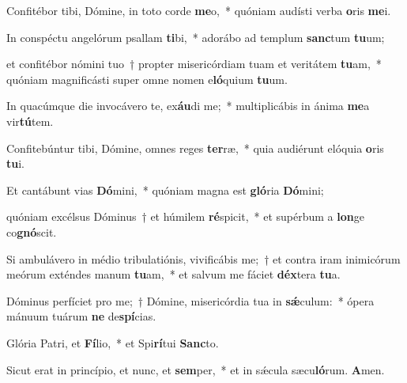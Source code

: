\item Confitébor tibi, Dómine, in toto corde \textbf{me}o,~* quóniam audísti verba \textbf{o}ris \textbf{me}i.

\item In conspéctu angelórum psallam \textbf{ti}bi,~* adorábo ad templum \textbf{sanc}tum \textbf{tu}um;

\item et confitébor nómini tuo~† propter misericórdiam tuam et veritátem \textbf{tu}am,~* quóniam magnificásti super omne nomen e\textbf{ló}quium \textbf{tu}um.

\item In quacúmque die invocávero te, ex\textbf{áu}di me;~* multiplicábis in ánima \textbf{me}a vir\textbf{tú}tem.

\item Confitebúntur tibi, Dómine, omnes reges \textbf{ter}ræ,~* quia audiérunt elóquia \textbf{o}ris \textbf{tu}i.

\item Et cantábunt vias \textbf{Dó}mini,~* quóniam magna est \textbf{gló}ria \textbf{Dó}mini;

\item quóniam excélsus Dóminus~† et húmilem \textbf{ré}spicit,~* et supérbum a \textbf{lon}ge co\textbf{gnó}scit.

\item Si ambulávero in médio tribulatiónis, vivificábis me;~† et contra iram inimicórum meórum exténdes manum \textbf{tu}am,~* et salvum me fáciet \textbf{déx}tera \textbf{tu}a.

\item Dóminus perfíciet pro me;~† Dómine, misericórdia tua in \textbf{sǽ}culum:~* ópera mánuum tuárum \textbf{ne} de\textbf{spí}cias.

\item Glória Patri, et \textbf{Fí}lio,~* et Spi\textbf{rí}tui \textbf{Sanc}to.

\item Sicut erat in princípio, et nunc, et \textbf{sem}per,~* et in sǽcula sæcu\textbf{ló}rum. \textbf{A}men.